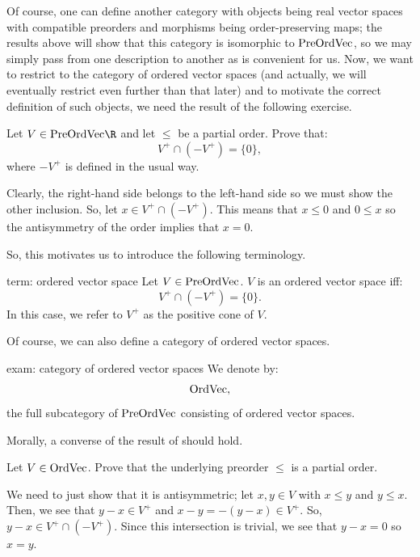 \documentclass[main.tex]{subfiles}
\begin{document}
Of course, one can define another category with objects being real vector spaces with compatible preorders and morphisms being order-preserving maps; the results above will show that this category is isomorphic to $\text{PreOrdVec}$, so we may simply pass from one description to another as is convenient for us. Now, we want to restrict to the category of ordered vector spaces (and actually, we will eventually restrict even further than that later) and to motivate the correct definition of such objects, we need the result of the following exercise. 

\begin{exercise}\label{ex: if the underlying relation on a preordered vector space is a partial order then we get the cone condition}Let $V \in \PreOrdVect{\R}$ and let $\leq$ be a partial order. Prove that:
\[V^+ \cap (-V^+) = \{0\},\] 
where $-V^+$ is defined in the usual way. 
\end{exercise}
\begin{solution}\label{sol: if the underlying relation on a preordered vector space is a partial order then we get the cone condition}Clearly, the right-hand side belongs to the left-hand side so we must show the other inclusion. So, let $x \in V^+ \cap (-V^+)$. This means that $x \leq 0$ and $0 \leq x$ so the antisymmetry of the order implies that $x = 0$. 
\end{solution}

So, this motivates us to introduce the following terminology. 

\begin{terminology}{}{term: ordered vector space} 
Let $V \in \text{PreOrdVec}$. $V$ is an ordered vector space iff:
\[V^+ \cap (-V^+) = \{0\}.\] 
In this case, we refer to $V^+$ as the positive cone of $V$. 
\end{terminology}

Of course, we can also define a category of ordered vector spaces. 

\begin{example}{}{exam: category of ordered vector spaces}
We denote by:
\[\text{OrdVec},\] 
the full subcategory of $\text{PreOrdVec}$ consisting of ordered vector spaces. 
\end{example}

Morally, a converse of the result of  should hold. 

\begin{exercise}\label{ex: underlying preorder of an ordered vector space is a partial order}Let $V \in \text{OrdVec}$. Prove that the underlying preorder $\leq$ is a partial order. 
\end{exercise}
\begin{solution}\label{sol: underlying preorder of an ordered vector space is a partial order}We need to just show that it is antisymmetric; let $x,y \in V$ with $x \leq y$ and $y \leq x$. Then, we see that $y-x \in V^+$ and $x-y = -(y-x) \in V^+$. So, $y-x \in V^+ \cap (-V^+)$. Since this intersection is trivial, we see that $y-x = 0$ so $x = y$. 
\end{solution}
\end{document}
